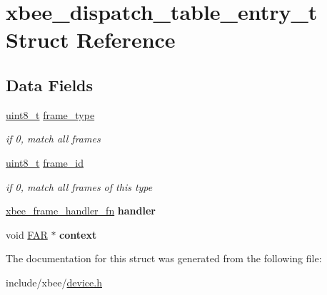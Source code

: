 \hypertarget{structxbee__dispatch__table__entry__t}{\section{xbee\-\_\-dispatch\-\_\-table\-\_\-entry\-\_\-t Struct Reference}
\label{structxbee__dispatch__table__entry__t}
}
\subsection*{Data Fields}
\begin{DoxyCompactItemize}
\item 
\hypertarget{group__xbee__device_gafa34d393db5fa915716b483011415ddc}{\hyperlink{group__hal_gae1affc9ca37cfb624959c866a73f83c2}{uint8\-\_\-t} \hyperlink{group__xbee__device_gafa34d393db5fa915716b483011415ddc}{frame\-\_\-type}}\label{group__xbee__device_gafa34d393db5fa915716b483011415ddc}

\begin{DoxyCompactList}\small\item\em if 0, match all frames \end{DoxyCompactList}\item 
\hypertarget{group__xbee__device_ga03c1016ac46b9df250b994f242cf956a}{\hyperlink{group__hal_gae1affc9ca37cfb624959c866a73f83c2}{uint8\-\_\-t} \hyperlink{group__xbee__device_ga03c1016ac46b9df250b994f242cf956a}{frame\-\_\-id}}\label{group__xbee__device_ga03c1016ac46b9df250b994f242cf956a}

\begin{DoxyCompactList}\small\item\em if 0, match all frames of this type \end{DoxyCompactList}\item 
\hypertarget{group__xbee__device_gacae6128cc991ffaa526063adc6dd9fe8}{\hyperlink{group__xbee__device_ga3d8f20fa50d6f72eaf03f0cdd4c9832b}{xbee\-\_\-frame\-\_\-handler\-\_\-fn} {\bfseries handler}}\label{group__xbee__device_gacae6128cc991ffaa526063adc6dd9fe8}

\item 
\hypertarget{group__xbee__device_gaa91f8e864e06077c354e5f5216547758}{void \hyperlink{group__hal_gaef060b3456fdcc093a7210a762d5f2ed}{F\-A\-R} $\ast$ {\bfseries context}}\label{group__xbee__device_gaa91f8e864e06077c354e5f5216547758}

\end{DoxyCompactItemize}


The documentation for this struct was generated from the following file\-:\begin{DoxyCompactItemize}
\item 
include/xbee/\hyperlink{device_8h}{device.\-h}\end{DoxyCompactItemize}
